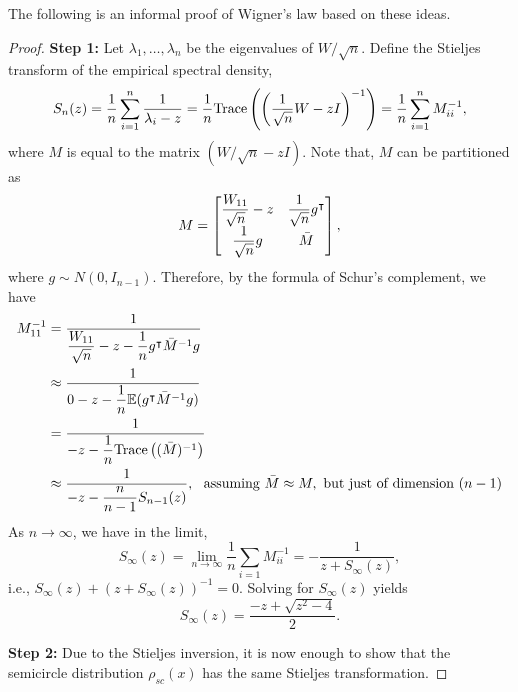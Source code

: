 \documentclass[12pt]{article}
\begin{document}
The following is an informal proof of Wigner's law based on these ideas.

\begin{proof}
    
    
    \noindent\textbf{Step 1:} 
    Let $\lambda_1, \dots, \lambda_n$ be the eigenvalues of $W/\sqrt{n}$. Define the Stieljes transform of the empirical spectral density, 
    \begin{equation*}
        S_n(z) = \dfrac{1}{n}\sum_{i=1}^n \dfrac{1}{\lambda_i - z} = \dfrac{1}{n}\text{\normalfont Trace}\left( \left( \dfrac{1}{\sqrt{n}}W - zI \right)^{-1} \right) = \dfrac{1}{n}\sum_{i=1}^n M_{ii}^{-1},
    \end{equation*}
    \noindent where $M$ is equal to the matrix $(W/\sqrt{n} - zI)$. Note that, $M$ can be partitioned as
    \begin{equation*}
        M = \begin{bmatrix}
            \dfrac{W_{11}}{\sqrt{n}} - z & \dfrac{1}{\sqrt{n}}g^{\intercal}\\
            \dfrac{1}{\sqrt{n}}g & \bar{M}\\
        \end{bmatrix},
    \end{equation*}
    \noindent where $g \sim N(0, I_{n-1})$. Therefore, by the formula of Schur's complement, we have
    \begin{align*}
        M_{11}^{-1} 
        & = \dfrac{1}{\dfrac{W_{11}}{\sqrt{n}} - z - \dfrac{1}{n}g^{\intercal} \bar{M}^{-1}g }\\
        & \approx \dfrac{1}{ 0 - z - \dfrac{1}{n}\mathbb{E}(g^{\intercal} \bar{M}^{-1} g) }\\
        & = \dfrac{1}{-z - \dfrac{1}{n} \text{\normalfont Trace}\left( (\bar{M})^{-1} \right) }\\
        & \approx \dfrac{1}{-z - \dfrac{n}{n-1}S_{n-1}(z)}, \ \text{ assuming } \bar{M} \approx M, \text{ but just of dimension } (n-1)
    \end{align*}
    \noindent As $n \rightarrow \infty$, we have in the limit,
    \begin{equation*}
        S_\infty(z) = \lim_{n\rightarrow \infty} \dfrac{1}{n}\sum_{i=1}M_{ii}^{-1}
        = -\dfrac{1}{z + S_\infty(z)},
    \end{equation*}
    \noindent i.e., $S_\infty(z) + (z + S_\infty(z))^{-1} = 0$. Solving for $S_\infty(z)$ yields
    \begin{equation*}
        S_\infty(z) = \dfrac{-z + \sqrt{z^2 - 4}}{2}.
    \end{equation*}

    \noindent\textbf{Step 2:}
    Due to the Stieljes inversion, it is now enough to show that the semicircle distribution $\rho_{sc}(x)$ has the same Stieljes transformation.


\end{proof}
\end{document}
